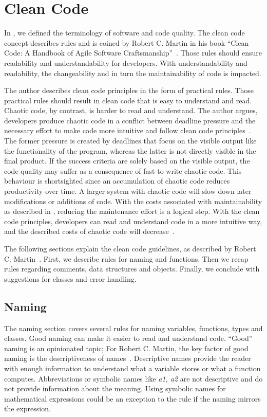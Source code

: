\section{Clean Code}\label{sec:clean_code}
In , we defined the terminology of software and code quality. The clean code concept describes rules and is coined by Robert C. Martin in his book \enquote{Clean Code: A Handbook of Agile Software Craftsmanship}~\cite{martin_clean_2009}. Those rules should ensure readability and understandability for developers. With understandability and readability, the changeability and in turn the maintainability of code is impacted.   

The author describes clean code principles in the form of practical rules. Those practical rules should result in clean code that is easy to understand and read. Chaotic code, by contrast, is harder to read and understand. The author argues, developers produce chaotic code in a conflict between deadline pressure and the necessary effort to make code more intuitive and follow clean code principles~\cite{martin_clean_2009}. The former pressure is created by deadlines that focus on the visible output like the functionality of the program, whereas the latter is not directly visible in the final product. If the success criteria are solely based on the visible output, the code quality may suffer as a consequence of fast-to-write chaotic code. This behaviour is shortsighted since an accumulation of chaotic code reduces productivity over time. A larger system with chaotic code will slow down later modifications or additions of code. With the costs associated with maintainability as described in , reducing the maintenance effort is a logical step. With the clean code principles, developers can read and understand code in a more intuitive way, and the described costs of chaotic code will decrease~\cite{martin_clean_2009}.

The following sections explain the clean code guidelines, as described by Robert C. Martin~\cite{martin_clean_2009}. First, we describe rules for naming and functions. Then we recap rules regarding comments, data structures and objects. Finally, we conclude with suggestions for classes and error handling.

\subsection{Naming}\label{sec:naming}
The naming section covers several rules for naming variables, functions, types and classes.
Good naming can make it easier to read and understand code. \enquote{Good} naming is an opinionated topic; For Robert C. Martin, the key factor of good naming is the descriptiveness of names~\cite{martin_clean_2009}. Descriptive names provide the reader with enough information to understand what a variable stores or what a function computes. Abbreviations or symbolic names like \textit{a1, a2} are not descriptive and do not provide information about the meaning. Using symbolic names for mathematical expressions could be an exception to the rule if the naming mirrors the expression.

